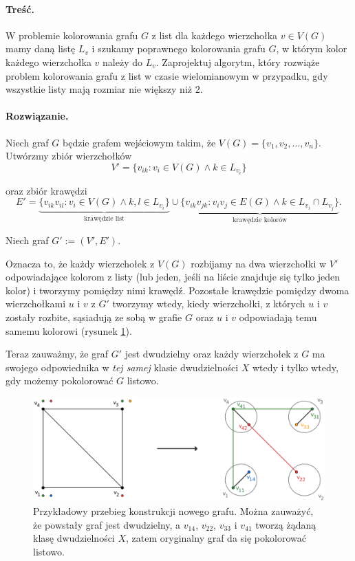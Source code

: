 \paragraph{Treść.} W problemie kolorowania grafu $G$ z list dla każdego wierzchołka 
$v \in V(G)$ mamy daną listę $L_v$ i
szukamy poprawnego kolorowania grafu $G$, w którym kolor każdego wierzchołka $v$ należy do $L_v$.
Zaprojektuj algorytm, który rozwiąże problem kolorowania grafu z list w czasie wielomianowym w przypadku, gdy
wszystkie listy mają rozmiar nie większy niż $2$.

\paragraph{Rozwiązanie.} 


Niech graf $G$ będzie grafem wejściowym takim, że
$V(G) = \{v_1, v_2, \ldots, v_n\}$. 
Utwórzmy zbiór wierzchołków
\[V' = \{v_{ik} : v_i\in V(G) \land k \in L_{v_i}\}\]

oraz zbiór krawędzi 
\[E' = \underbrace{\{v_{ik}v_{il} : v_i \in V(G) \land k, l \in L_{v_i}\}}_\text{krawędzie list} \cup 
\underbrace{\{v_{ik}v_{jk} : v_iv_j \in E(G) \land k\in L_{v_i} \cap L_{v_j}\}}_\text{krawędzie kolorów}.\]

Niech graf $G' := (V', E')$. 

Oznacza to, że każdy wierzchołek z $V(G)$ rozbijamy na dwa wierzchołki w $V'$ odpowiadające kolorom z listy (lub jeden, jeśli na liście znajduje się tylko jeden kolor) i tworzymy pomiędzy 
nimi krawędź. Pozostałe krawędzie pomiędzy dwoma wierzchołkami
$u$ i $v$ z $G'$ tworzymy wtedy, kiedy wierzchołki,
z których $u$ i $v$ zostały rozbite, sąsiadują ze sobą
w grafie $G$ oraz $u$ i $v$ odpowiadają temu samemu kolorowi (rysunek \ref{fig:kolorowanielistowe}). 

Teraz zauważmy, że graf $G'$ jest dwudzielny oraz każdy wierzchołek z $G$ ma swojego odpowiednika w \emph{tej samej} klasie dwudzielności $X$ wtedy i tylko wtedy, gdy możemy pokolorować $G$ listowo. 

\begin{figure}[H]
\centering
\includegraphics[trim=0 150 0 60,clip,width=\linewidth]{data/3listcol.eps}
\caption{Przykładowy przebieg konstrukcji nowego grafu. Można zauważyć, że powstały graf jest dwudzielny, a $v_{14}$, $v_{22}$, $v_{33}$ i $v_{41}$ tworzą żądaną klasę dwudzielności $X$, zatem oryginalny graf da się pokolorować listowo.}
\label{fig:kolorowanielistowe}
\end{figure}

